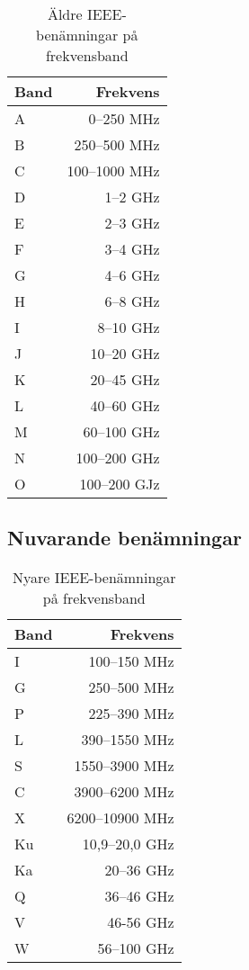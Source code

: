 \begin{table}[H]
	\centering
	\begin{tabular}{lr}
		\textbf{Band} & \textbf{Frekvens} \\ \hline
		A             &        0--250 MHz \\
		B             &      250--500 MHz \\
		C             &     100--1000 MHz \\
		D             &          1--2 GHz \\
		E             &          2--3 GHz \\
		F             &          3--4 GHz \\
		G             &          4--6 GHz \\
		H             &          6--8 GHz \\
		I             &         8--10 GHz \\
		J             &        10--20 GHz \\
		K             &        20--45 GHz \\
		L             &        40--60 GHz \\
		M             &       60--100 GHz \\
		N             &      100--200 GHz \\
		O             &      100--200 GJz
	\end{tabular}
	\caption{Äldre IEEE-benämningar på frekvensband}
\end{table}

\subsection{Nuvarande benämningar}

\begin{table}[H]
	\centering
	\begin{tabular}{lr}
		\textbf{Band} & \textbf{Frekvens} \\ \hline
		I             &      100--150 MHz \\
		G             &      250--500 MHz \\
		P             &      225--390 MHz \\
		L             &     390--1550 MHz \\
		S             &    1550--3900 MHz \\
		C             &    3900--6200 MHz \\
		X             &   6200--10900 MHz \\
		Ku            &    10,9--20,0 GHz \\
		Ka            &        20--36 GHz \\
		Q             &        36--46 GHz \\
		V             &         46-56 GHz \\
		W             &       56--100 GHz
	\end{tabular}
	\caption{Nyare IEEE-benämningar på frekvensband}
\end{table}

